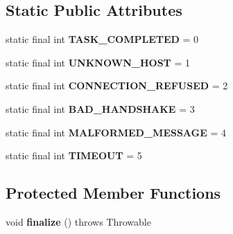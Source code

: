 \subsection*{Static Public Attributes}
\begin{DoxyCompactItemize}
\item 
\hypertarget{classj_bittorrent_a_p_i_1_1_download_task_a2732a378d5dbb099688413ac8087e810}{
static final int {\bfseries TASK\_\-COMPLETED} = 0}
\label{classj_bittorrent_a_p_i_1_1_download_task_a2732a378d5dbb099688413ac8087e810}

\item 
\hypertarget{classj_bittorrent_a_p_i_1_1_download_task_a23c3dac856cd53a66657252a804ca1cb}{
static final int {\bfseries UNKNOWN\_\-HOST} = 1}
\label{classj_bittorrent_a_p_i_1_1_download_task_a23c3dac856cd53a66657252a804ca1cb}

\item 
\hypertarget{classj_bittorrent_a_p_i_1_1_download_task_a9ebd1310d185a42794afda93fb90c08b}{
static final int {\bfseries CONNECTION\_\-REFUSED} = 2}
\label{classj_bittorrent_a_p_i_1_1_download_task_a9ebd1310d185a42794afda93fb90c08b}

\item 
\hypertarget{classj_bittorrent_a_p_i_1_1_download_task_a16194b7e7645af68049fefee215a63e4}{
static final int {\bfseries BAD\_\-HANDSHAKE} = 3}
\label{classj_bittorrent_a_p_i_1_1_download_task_a16194b7e7645af68049fefee215a63e4}

\item 
\hypertarget{classj_bittorrent_a_p_i_1_1_download_task_a8e25c3eb200e692136d921de8a96a3d7}{
static final int {\bfseries MALFORMED\_\-MESSAGE} = 4}
\label{classj_bittorrent_a_p_i_1_1_download_task_a8e25c3eb200e692136d921de8a96a3d7}

\item 
\hypertarget{classj_bittorrent_a_p_i_1_1_download_task_adb8766e486bc5c6d259035475ce241e5}{
static final int {\bfseries TIMEOUT} = 5}
\label{classj_bittorrent_a_p_i_1_1_download_task_adb8766e486bc5c6d259035475ce241e5}

\end{DoxyCompactItemize}
\subsection*{Protected Member Functions}
\begin{DoxyCompactItemize}
\item 
\hypertarget{classj_bittorrent_a_p_i_1_1_download_task_a5fe60e63cc20c1c546660d96d51550d9}{
void {\bfseries finalize} ()  throws Throwable}
\label{classj_bittorrent_a_p_i_1_1_download_task_a5fe60e63cc20c1c546660d96d51550d9}

\end{DoxyCompactItemize}


